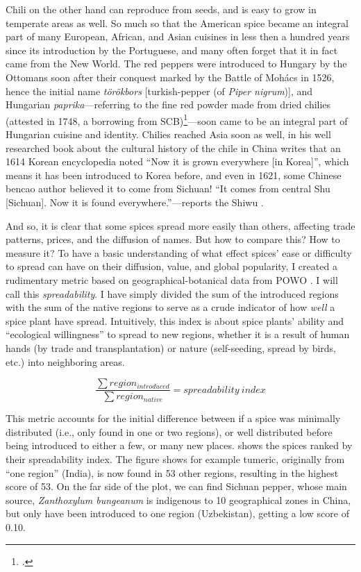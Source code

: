 Chili on the other hand can reproduce from seeds, and is easy to grow in temperate areas as well. So much so that the American spice became an integral part of many European, African, and Asian cuisines in less then a hundred years since its introduction by the Portuguese, and many often forget that it in fact came from the New World. The red peppers were introduced to Hungary by the Ottomans soon after their conquest marked by the Battle of Mohács in 1526, hence the initial name \textit{törökbors} [turkish-pepper (of \textit{Piper nigrum})], and Hungarian \textit{paprika}---referring to the fine red powder made from dried chilies (attested in 1748, a borrowing from \gls{SCB})\footcite[paprika]{zaicz_etimologiai_2006}---soon came to be an integral part of Hungarian cuisine and identity. Chilies reached Asia soon as well, \textcite{dott_chile_2020} in his well researched book about the cultural history of the chile in China writes that an 1614 Korean encyclopedia noted ``Now it is grown everywhere [in Korea]'', which means it has been introduced to Korea before, and even in 1621, some Chinese \gls{bencao} author believed it to come from Sichuan! ``It comes from central Shu [Sichuan]. Now it is found everywhere.''---reports the \gls{Shiwu} \autocite[24,28]{dott_chile_2020}.

And so, it is clear that some spices spread more easily than others, affecting trade patterns, prices, and the diffusion of names. But how to compare this? How to measure it? To have a basic understanding of what effect spices' ease or difficulty to spread can have on their diffusion, value, and global popularity, I created a rudimentary metric based on geographical-botanical data from \gls{POWO} \autocite{powo}. I will call this \textit{spreadability}. I have simply divided the sum of the introduced regions with the sum of the native regions to serve as a crude indicator of how \textit{well} a spice plant have spread. Intuitively, this index is about spice plants' ability and ``ecological willingness'' to spread to new regions, whether it is a result of human hands (by trade and transplantation) or nature (self-seeding, spread by birds, etc.) into neighboring areas. 

\[ \frac{\sum region_{introduced}}{\sum region_{native}} = spreadability~index \]

\noindent This metric accounts for the initial difference between if a spice was minimally distributed (i.e., only found in one or two regions), or well distributed before being introduced to either a few, or many new places.  shows the spices ranked by their spreadability index. The figure shows for example tumeric, originally from ``one region'' (India), is now found in 53 other regions, resulting in the highest score of 53. On the far side of the plot, we can find Sichuan pepper, whose main source, \textit{Zanthoxylum bungeanum} is indigenous to 10 geographical zones in China, but only have been introduced to one region (Uzbekistan), getting a low score of 0.10.



